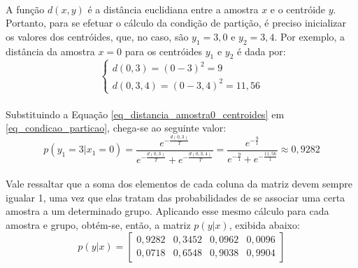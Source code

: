 \documentclass{report}
\begin{document}
\paragraph{} A função $d(x,y)$ é a distância euclidiana entre a amostra $x$ e o centróide $y$. Portanto, para se efetuar o cálculo da condição de partição, é preciso inicializar os valores dos centróides, que, no caso, são $y_1 = 3,0$ e $y_2 = 3,4$. Por exemplo, a distância da amostra $x = 0$ para os centróides $y_1$ e $y_2$ é dada por:\\

\begin{equation}\label{eq_distancia_amostra0_centroides}
\begin{cases}
	d(0,3) = (0-3)^2 = 9\\
	d(0,3,4) = (0-3,4)^2 = 11,56
\end{cases}
\end{equation} 

\paragraph{} Substituindo a Equação \eqref{eq_distancia_amostra0_centroides} em \eqref{eq_condicao_particao}, chega-se ao seguinte valor:\\

\begin{equation}
p(y_1 = 3|x_1 = 0) = \frac{e^{-\frac{d(0,3)}{T}}}{e^{-\frac{d(0,3)}{T}} + e^{-\frac{d(0,3,4)}{T}}} = \frac{e^{-\frac{9}{1}}}{e^{-\frac{9}{1}} + e^{-\frac{11,56}{1}}} \approx 0,9282 
\end{equation}

\paragraph{} Vale ressaltar que a soma dos elementos de cada coluna da matriz devem sempre igualar 1, uma vez que elas tratam das probabilidades de se associar uma certa amostra a um determinado grupo. Aplicando esse mesmo cálculo para cada amostra e grupo, obtém-se, então, a matriz $p(y|x)$, exibida abaixo:\\

\begin{equation}
p(y|x) = \left[\begin{array}{cccc}
0,9282 & 0,3452 & 0,0962 & 0,0096 \\ 
0,0718 & 0,6548 & 0,9038 & 0,9904
\end{array} \right]
\end{equation}\\
\end{document}
